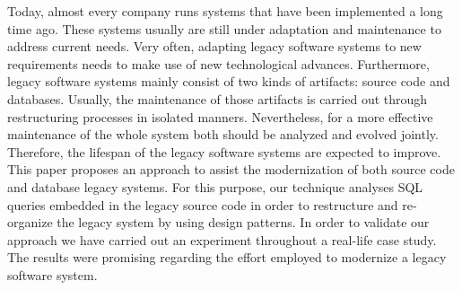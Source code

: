 Today, almost every company runs systems that have been implemented a long time ago. These systems usually are still under adaptation and maintenance to address current needs. Very often, adapting legacy software systems to new requirements needs to make use of new technological advances. Furthermore, legacy software systems mainly consist of two kinds of artifacts: source code and databases. Usually, the maintenance of those artifacts is carried out through restructuring processes in isolated manners. Nevertheless, for a more effective maintenance of the whole system both should be analyzed and evolved jointly. Therefore, the lifespan of the legacy software systems are expected to improve. This paper proposes an approach to assist the modernization of both source code and database legacy systems. For this purpose, our technique analyses SQL queries embedded in the legacy source code in order to restructure and re-organize the legacy system by using design patterns. In  order to validate our approach we have carried out an experiment throughout a real-life case study. The results were promising regarding the effort employed to modernize a legacy software system.